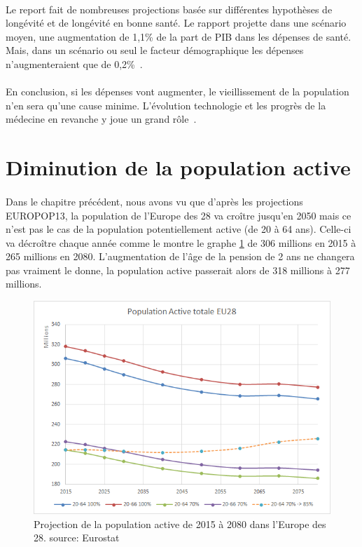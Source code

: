 \paragraph{}Le report fait de nombreuses projections basée sur différentes hypothèses de longévité et de longévité en bonne santé.  Le rapport projette dans une scénario moyen, une augmentation de 1,1\% de la part de PIB dans les dépenses de santé. Mais, dans un scénario ou seul le facteur démographique les dépenses n’augmenteraient que de 0,2\%~\citep[pp.18]{ageing}. 

\paragraph{}En conclusion, si les dépenses vont augmenter, le vieillissement de la population n’en sera qu’une cause minime. L’évolution technologie et les progrès de la médecine en revanche y joue un grand rôle~\citep[pp.120]{ageing}. 

\section{Diminution de la population active}
\paragraph{}Dans le chapitre précédent, nous avons vu que d’après les projections EUROPOP13, la population de l’Europe des 28 va croître jusqu’en 2050 mais ce n’est pas le cas de la population potentiellement active (de 20 à 64 ans). Celle-ci va décroître chaque année comme le montre le graphe \ref{active} de 306 millions en 2015 à 265 millions en 2080. L’augmentation de l’âge de la pension de 2 ans ne changera pas vraiment le donne, la population active passerait alors de 318 millions à 277 millions. 

\begin{figure}[h!]
    \begin{center}
        \includegraphics[scale=0.7]{document/active.png}
        \caption{Projection de la population active de 2015 à 2080 dans l'Europe des 28. source: Eurostat~\citep{eurostat_europop13}}
        \label{active}
    \end{center}
\end{figure}

